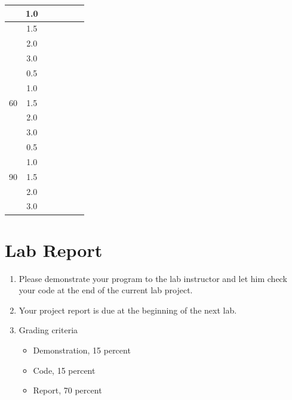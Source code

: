 \documentclass[letterpaper,12pt]{article}
\begin{document}
\begin{enumerate}
\begin{table}[H]
\begin{center}
\begin{tabular}{|c|c|c|c|c|c|c|}
                & 1.0 & & & & \\ \hline
                & 1.5 & & & & \\ \hline
                & 2.0 & & & & \\ \hline
                & 3.0 & & & & \\ \hline
                \multirow{5}{*}{60} & 0.5 & & & & \\ \hline
                & 1.0 & & & & \\ \hline
                & 1.5 & & & & \\ \hline
                & 2.0 & & & & \\ \hline
                & 3.0 & & & & \\ \hline
                \multirow{5}{*}{90} & 0.5 & & & & \\ \hline
                & 1.0 & & & & \\ \hline
                & 1.5 & & & & \\ \hline
                & 2.0 & & & & \\ \hline
                & 3.0 & & & & \\ \hline
            \end{tabular}
        \end{center}
        \end{table}
\section*{Lab Report}
\begin{enumerate}
   \item Please demonstrate your program to the lab instructor and let him check your code at the end of the current lab project.
   \item Your project report is due at the beginning of the next lab.
   \item Grading criteria
      \begin{itemize}
         \item Demonstration, 15 percent
         \item Code, 15 percent
         \item Report, 70 percent
      \end{itemize}
\end{enumerate}

\end{enumerate}
\end{document}
